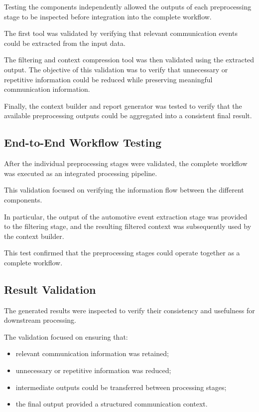 Testing the components independently allowed the outputs of each preprocessing stage to be inspected before integration into the complete workflow.

The first tool was validated by verifying that relevant communication events could be extracted from the input data.

The filtering and context compression tool was then validated using the extracted output. The objective of this validation was to verify that unnecessary or repetitive information could be reduced while preserving meaningful communication information.

Finally, the context builder and report generator was tested to verify that the available preprocessing outputs could be aggregated into a consistent final result.

\subsection{End-to-End Workflow Testing}

After the individual preprocessing stages were validated, the complete workflow was executed as an integrated processing pipeline.

This validation focused on verifying the information flow between the different components.

In particular, the output of the automotive event extraction stage was provided to the filtering stage, and the resulting filtered context was subsequently used by the context builder.

This test confirmed that the preprocessing stages could operate together as a complete workflow.

\subsection{Result Validation}

The generated results were inspected to verify their consistency and usefulness for downstream processing.

The validation focused on ensuring that:

\begin{itemize}
    \item relevant communication information was retained;
    \item unnecessary or repetitive information was reduced;
    \item intermediate outputs could be transferred between processing stages;
    \item the final output provided a structured communication context.
\end{itemize}

